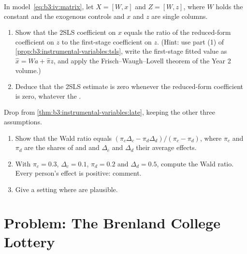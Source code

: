 \begin{exercise}[$\star\star\star$]\label{exo:b3:instrumental-variables:11}
In model~\eqref{eq:b3:iv:matrix}, let $X = [W, x]$ and $Z = [W, z]$, where $W$
holds the constant and the exogenous controls and $x$ and $z$ are single
columns.
\begin{enumerate}
\item Show that the 2SLS coefficient on $x$ equals the ratio of the
reduced-form coefficient on $z$ to the first-stage coefficient on $z$. (Hint:
use part (1) of \cref{prop:b3:instrumental-variables:tsls}, write the
first-stage fitted value as $\hat x = W a + \hat\pi z$, and apply the
Frisch--Waugh--Lovell theorem of the Year 2 volume.)
\item Deduce that the 2SLS estimate is zero whenever the reduced-form
coefficient is zero, whatever the .
\end{enumerate}
\end{exercise}

\begin{exercise}[$\star\star\star$]\label{exo:b3:instrumental-variables:12}
Drop  from \cref{thm:b3:instrumental-variables:late}, keeping the
other three assumptions.
\begin{enumerate}
\item Show that the Wald ratio equals $(\pi_c \Delta_c - \pi_d
\Delta_d)/(\pi_c - \pi_d)$, where $\pi_c$ and $\pi_d$ are the shares of
 and  and $\Delta_c$ and $\Delta_d$ their average effects.
\item With $\pi_c = 0.3$, $\Delta_c = 0.1$, $\pi_d = 0.2$ and $\Delta_d = 0.5$,
compute the Wald ratio. Every person's effect is positive: comment.
\item Give a setting where  are plausible.
\end{enumerate}
\end{exercise}

\section{Problem: The Brenland College Lottery}\label{sec:b3:instrumental-variables:problem}

